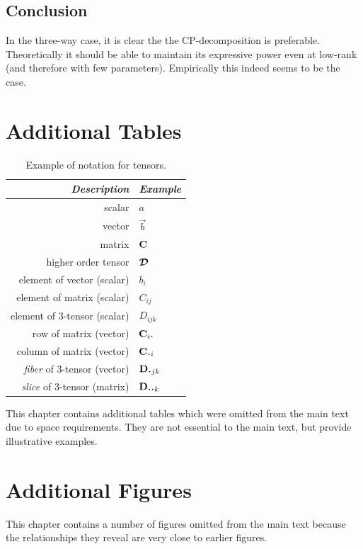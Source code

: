 \section{Conclusion}
In the three-way case, it is clear the the CP-decomposition is preferable. Theoretically it should
be able to maintain its expressive power even at low-rank (and therefore with few parameters).
Empirically this indeed seems to be the case. 

\chapter{Additional Tables}
\begin{table}
\centering
\begin{tabu} to 0.5\linewidth {|r|l|}
\hline 
\textit{Description} & \textit{Example} \\
\hline
scalar & \(a\) \\
vector & \(\vec{b}\) \\
matrix & \(\mathbf{C}\) \\
higher order tensor & \(\bm{\mathcal{D}}\) \\
element of vector (scalar) & \(b_i\) \\
element of matrix (scalar) & \(C_{ij}\) \\
element of 3-tensor (scalar) & \(D_{ijk}\) \\
row of matrix (vector) & \(\vec{C}_{i\midbullet}\) \\
column of matrix (vector) & \(\vec{C}_{\midbullet i}\)\\
\textit{fiber} of 3-tensor (vector) & \(\vec{D}_{\midbullet jk}\)\\
\textit{slice} of 3-tensor (matrix) & \(\mat{D}_{\midbullet\midbullet k}\)\\
\hline
\end{tabu}
\caption{Example of notation for tensors.}
\label{tab:notation}
\end{table}

This chapter contains additional tables which were omitted from the main text due to space
requirements. They are not essential to the main text, but provide illustrative examples.

\chapter{Additional Figures}
This chapter contains a number of figures omitted from the main text because the relationships
they reveal are very close to earlier figures.

